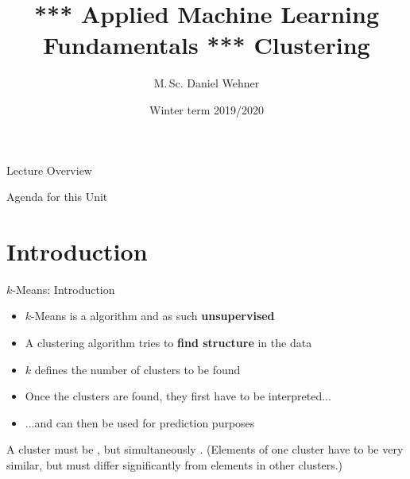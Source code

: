 


\title[Clustering]{*** Applied Machine Learning Fundamentals *** Clustering}
\author{M.\,Sc. Daniel Wehner}
\date{Winter term 2019/2020}




\maketitlepage


\begin{frame}{Lecture Overview}{}
\end{frame}


\begin{frame}{Agenda for this Unit}
	\begin{multicols}{2}
		\tableofcontents
	\end{multicols}
\end{frame}


\section{Introduction}

\begin{frame}{$k$-Means: Introduction}{}
	\begin{itemize}
		\item $k$-Means is a  algorithm and as such \textbf{unsupervised}
		\item A clustering algorithm tries to \textbf{find structure} in the data
		\item $k$ defines the number of clusters to be found
		\item Once the clusters are found, they first have to be interpreted...
		\item ...and can then be used for prediction purposes
	\end{itemize}
	
	\begin{boxBlue}
		\footnotesize
		A cluster must be , but simultaneously .
		(Elements of one cluster have to be very similar, but must differ significantly from elements in other clusters.)
	\end{boxBlue}
\end{frame}


